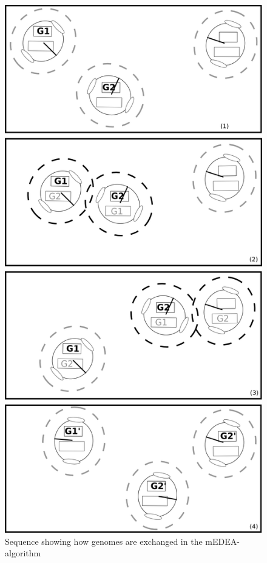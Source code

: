 \documentclass[a4paper]{book}
\begin{document}
\begin{figure}[H]
\includegraphics[height= \textheight]{misc/medea.png}
\caption{Sequence showing how genomes are exchanged in the mEDEA-algorithm}
\label{fig:medea}
\end{figure}
\end{document}
